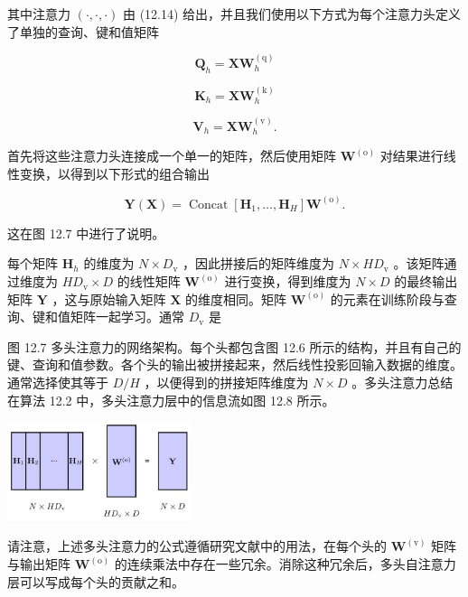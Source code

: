 \documentclass[10pt]{article}
\begin{document}
其中注意力 \(\left( {\cdot ,\cdot , \cdot  }\right)\) 由 (12.14) 给出，并且我们使用以下方式为每个注意力头定义了单独的查询、键和值矩阵

\[
{\mathbf{Q}}_{h} = {\mathbf{{XW}}}_{h}^{\left( \mathrm{q}\right) } \tag{12.16}
\]

\[
{\mathbf{K}}_{h} = \mathbf{X}{\mathbf{W}}_{h}^{\left( \mathrm{k}\right) } \tag{12.17}
\]

\[
{\mathbf{V}}_{h} = \mathbf{X}{\mathbf{W}}_{h}^{\left( \mathrm{v}\right) }. \tag{12.18}
\]

首先将这些注意力头连接成一个单一的矩阵，然后使用矩阵 \({\mathbf{W}}^{\left( \mathrm{o}\right) }\) 对结果进行线性变换，以得到以下形式的组合输出

\[
\mathbf{Y}\left( \mathbf{X}\right)  = \operatorname{Concat}\left\lbrack  {{\mathbf{H}}_{1},\ldots ,{\mathbf{H}}_{H}}\right\rbrack  {\mathbf{W}}^{\left( \mathrm{o}\right) }. \tag{12.19}
\]

这在图 12.7 中进行了说明。

每个矩阵 \({\mathbf{H}}_{h}\) 的维度为 \(N \times  {D}_{\mathrm{v}}\) ，因此拼接后的矩阵维度为 \(N \times  H{D}_{\mathrm{v}}\) 。该矩阵通过维度为 \(H{D}_{\mathrm{v}} \times  D\) 的线性矩阵 \({\mathbf{W}}^{\left( \mathrm{o}\right) }\) 进行变换，得到维度为 \(N \times  D\) 的最终输出矩阵 \(\mathbf{Y}\) ，这与原始输入矩阵 \(\mathbf{X}\) 的维度相同。矩阵 \({\mathbf{W}}^{\left( \mathrm{o}\right) }\) 的元素在训练阶段与查询、键和值矩阵一起学习。通常 \({D}_{\mathrm{v}}\) 是

图 12.7 多头注意力的网络架构。每个头都包含图 12.6 所示的结构，并且有自己的键、查询和值参数。各个头的输出被拼接起来，然后线性投影回输入数据的维度。通常选择使其等于 \(D/H\) ，以便得到的拼接矩阵维度为 \(N \times  D\) 。多头注意力总结在算法 12.2 中，多头注意力层中的信息流如图 12.8 所示。

\begin{center}
\includegraphics[max width=0.4\textwidth]{images/0194e279-9b28-703a-88f4-c3ac21e2010d_387_944_347_607_330_0.jpg}
\end{center}
\hspace*{3em} 

请注意，上述多头注意力的公式遵循研究文献中的用法，在每个头的 \({\mathbf{W}}^{\left( \mathrm{v}\right) }\) 矩阵与输出矩阵 \({\mathbf{W}}^{\left( \mathrm{o}\right) }\) 的连续乘法中存在一些冗余。消除这种冗余后，多头自注意力层可以写成每个头的贡献之和。
\end{document}
